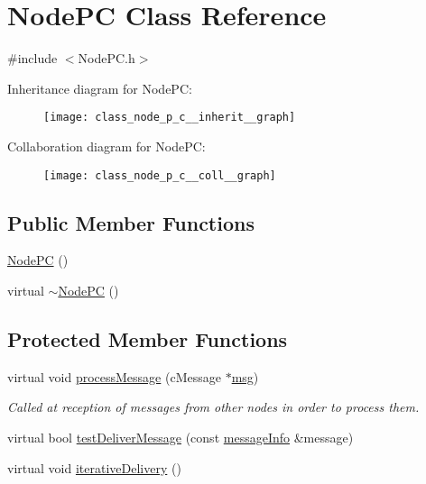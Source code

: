 \hypertarget{class_node_p_c}{}\section{Node\+PC Class Reference}
\label{class_node_p_c}


{\ttfamily \#include $<$Node\+P\+C.\+h$>$}



Inheritance diagram for Node\+PC\+:
\nopagebreak
\begin{figure}[H]
\begin{center}
\leavevmode
\texttt{[image: class\_node\_p\_c\_\_inherit\_\_graph]}
\end{center}
\end{figure}


Collaboration diagram for Node\+PC\+:
\nopagebreak
\begin{figure}[H]
\begin{center}
\leavevmode
\texttt{[image: class\_node\_p\_c\_\_coll\_\_graph]}
\end{center}
\end{figure}
\subsection*{Public Member Functions}
\begin{DoxyCompactItemize}
\item 
\hyperlink{class_node_p_c_a0b937d3f3d409fd1a8d1c15170d97675}{Node\+PC} ()
\item 
virtual \hyperlink{class_node_p_c_a823ec7244202157115f6d587c0c565dc}{$\sim$\+Node\+PC} ()
\end{DoxyCompactItemize}
\subsection*{Protected Member Functions}
\begin{DoxyCompactItemize}
\item 
virtual void \hyperlink{class_node_p_c_aa5fedc4136104a06e2f1131f1ba16b0e}{process\+Message} (c\+Message $\ast$\hyperlink{_controller_8h_afa0f3b802fbc219228f7bb97996fa558}{msg})
\begin{DoxyCompactList}\small\item\em Called at reception of messages from other nodes in order to process them. \end{DoxyCompactList}\item 
virtual bool \hyperlink{class_node_p_c_a54731196935596e0c6f094a5a8420134}{test\+Deliver\+Message} (const \hyperlink{structures_8h_a7e7bdc1d2fff8a9436f2f352b2711ed6}{message\+Info} \&message)
\item 
virtual void \hyperlink{class_node_p_c_a7ac363db597ebadd3b18dd4343440aa1}{iterative\+Delivery} ()
\end{DoxyCompactItemize}
